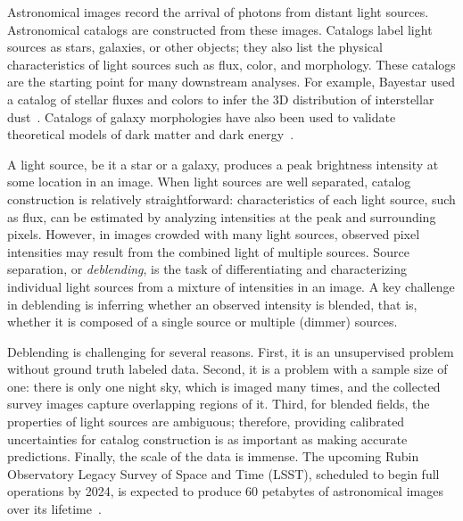 Astronomical images record the arrival of photons from distant light sources.
Astronomical catalogs are constructed from these images.
Catalogs label light sources as stars, galaxies, or other objects;
they also list the physical characteristics of light sources such as flux, color, and morphology.
These catalogs are the starting point for many downstream analyses.
For example, Bayestar used a catalog of stellar fluxes and colors to infer
the 3D distribution of interstellar dust~\citep{Green_2019_argonaut}.
Catalogs of galaxy morphologies have also been used to validate theoretical models of dark matter and dark energy~\citep{Abbott2018}.

A light source, be it a star or a galaxy, produces a peak brightness intensity at some location in an image.
When light sources are well separated, catalog construction is relatively straightforward:
characteristics of each light source, such as flux, can be estimated by analyzing
intensities at the peak and surrounding pixels.
However, in images crowded with many light sources,
observed pixel intensities may result from the combined light of multiple sources.
Source separation, or {\itshape deblending}, is the task of differentiating and
characterizing individual light sources from a mixture of intensities in an image.
A key challenge in deblending is inferring whether an observed intensity is blended,
that is, whether it is composed of a single source or multiple (dimmer) sources.


Deblending is challenging for several reasons.
First, it is an unsupervised problem without ground truth labeled data.
Second, it is a problem with a sample size of one: there is only one night sky, which is imaged many times, and the collected survey images capture overlapping regions of it.
Third, for blended fields, the properties of light sources are ambiguous; therefore, providing calibrated uncertainties for catalog construction is as important as making accurate predictions.
Finally, the scale of the data is immense.
The upcoming Rubin Observatory Legacy Survey of Space and Time (LSST),
scheduled to begin full operations by 2024,
is expected to produce 60 petabytes of astronomical images over its lifetime~\citep{LSSTabout}.

